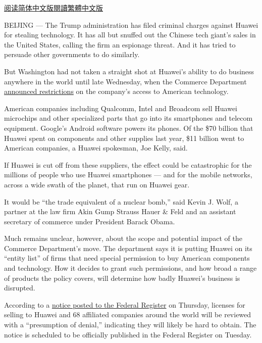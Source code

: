 \href{https://cn.nytimes.com/technology/20190517/huawei-export-controls/}{阅读简体中文版}\href{https://cn.nytimes.com/technology/20190517/huawei-export-controls/zh-hant/}{閱讀繁體中文版}

BEIJING --- The Trump administration has filed criminal charges against
Huawei for stealing technology. It has all but snuffed out the Chinese
tech giant's sales in the United States, calling the firm an espionage
threat. And it has tried to persuade other governments to do similarly.

But Washington had not taken a straight shot at Huawei's ability to do
business anywhere in the world until late Wednesday, when the Commerce
Department
\href{https://www.nytimes.com/2019/05/15/business/huawei-ban-trump.html}{announced
restrictions} on the company's access to American technology.

American companies including Qualcomm, Intel and Broadcom sell Huawei
microchips and other specialized parts that go into its smartphones and
telecom equipment. Google's Android software powers its phones. Of the
\$70 billion that Huawei spent on components and other supplies last
year, \$11 billion went to American companies, a Huawei spokesman, Joe
Kelly, said.

If Huawei is cut off from these suppliers, the effect could be
catastrophic for the millions of people who use Huawei smartphones ---
and for the mobile networks, across a wide swath of the planet, that run
on Huawei gear.

It would be ``the trade equivalent of a nuclear bomb,'' said Kevin J.
Wolf, a partner at the law firm Akin Gump Strauss Hauer \& Feld and an
assistant secretary of commerce under President Barack Obama.

Much remains unclear, however, about the scope and potential impact of
the Commerce Department's move. The department says it is putting Huawei
on its ``entity list'' of firms that need special permission to buy
American components and technology. How it decides to grant such
permissions, and how broad a range of products the policy covers, will
determine how badly Huawei's business is disrupted.

According to a
\href{https://www.federalregister.gov/documents/2019/05/21/2019-10616/addition-of-entities-to-the-entity-list}{notice
posted to the Federal Register} on Thursday, licenses for selling to
Huawei and 68 affiliated companies around the world will be reviewed
with a ``presumption of denial,'' indicating they will likely be hard to
obtain. The notice is scheduled to be officially published in the
Federal Register on Tuesday.

